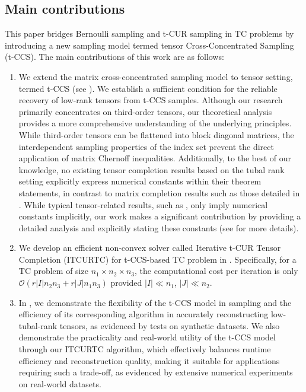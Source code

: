 \documentclass[twoside,12pt]{article}
\begin{document}
 \subsection{Main contributions} 
This paper bridges Bernoulli sampling and t-CUR sampling in TC problems by introducing a new sampling model termed tensor Cross-Concentrated Sampling (t-CCS). The main contributions of this work are as follows:  
\begin{enumerate}[label=(\roman*), labelindent=0pt]
\item  We extend  the matrix cross-concentrated sampling model \citep{cai2023matrix} to tensor setting, termed  t-CCS (see ). We establish a sufficient condition for the reliable recovery of low-rank tensors from t-CCS samples. Although our research primarily concentrates on third-order tensors, our theoretical analysis provides a more comprehensive understanding of the underlying principles. While third-order tensors can be flattened into  block diagonal matrices, the interdependent sampling properties of the index set  prevent the direct application of matrix Chernoff inequalities. Additionally, to the best of our knowledge,  no existing tensor completion results based on the tubal rank setting explicitly express numerical constants within their theorem statements, in contrast to matrix completion results such as those detailed in \citep[Theorem 1.1]{recht2011simpler}. While typical tensor-related results, such as \citep[Theorem 3.1]{zhang2017exact},   only imply numerical constants implicitly, our work makes a significant contribution by providing a detailed analysis and explicitly stating these constants (see  for more details). %
\item  We  develop an efficient non-convex solver called Iterative t-CUR Tensor Completion (ITCURTC) for t-CCS-based TC problem in . Specifically, for a TC problem of size $n_1\times n_2\times n_3$, the computational cost per iteration is only $\mathcal{O}(r|I|n_{2}n_{3}+r|J|n_{1}n_{3})$  provided $|I|\ll n_1$, $|J|\ll n_2$. %
\item In , we demonstrate the flexibility of the t-CCS model in sampling and the efficiency of its corresponding algorithm in accurately reconstructing low-tubal-rank tensors, as evidenced by tests on synthetic datasets. We also demonstrate the practicality and real-world utility  of the t-CCS model through our ITCURTC algorithm, which effectively balances runtime efficiency and reconstruction quality,  making  it  suitable  for applications requiring such a trade-off, as evidenced by extensive numerical experiments on real-world datasets.
\end{enumerate}
\end{document}
